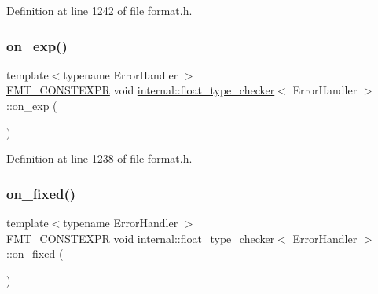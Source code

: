 Definition at line 1242 of file format.\+h.

\mbox{\label{classinternal_1_1float__type__checker_a22fe183efa70f61a4e4a2bc7311f8074}} 
\subsubsection{\texorpdfstring{on\+\_\+exp()}{on\_exp()}}
{\footnotesize\ttfamily template$<$typename Error\+Handler $>$ \\
\hyperlink{core_8h_a69201cb276383873487bf68b4ef8b4cd}{F\+M\+T\+\_\+\+C\+O\+N\+S\+T\+E\+X\+PR} void \hyperlink{classinternal_1_1float__type__checker}{internal\+::float\+\_\+type\+\_\+checker}$<$ Error\+Handler $>$\+::on\+\_\+exp (\begin{DoxyParamCaption}{ }\end{DoxyParamCaption})\hspace{0.3cm}{\ttfamily [inline]}}



Definition at line 1238 of file format.\+h.

\mbox{\label{classinternal_1_1float__type__checker_a00c9789b9c02c3e30fe59d3fd0fc7bae}} 
\subsubsection{\texorpdfstring{on\+\_\+fixed()}{on\_fixed()}}
{\footnotesize\ttfamily template$<$typename Error\+Handler $>$ \\
\hyperlink{core_8h_a69201cb276383873487bf68b4ef8b4cd}{F\+M\+T\+\_\+\+C\+O\+N\+S\+T\+E\+X\+PR} void \hyperlink{classinternal_1_1float__type__checker}{internal\+::float\+\_\+type\+\_\+checker}$<$ Error\+Handler $>$\+::on\+\_\+fixed (\begin{DoxyParamCaption}{ }\end{DoxyParamCaption})\hspace{0.3cm}{\ttfamily [inline]}}



